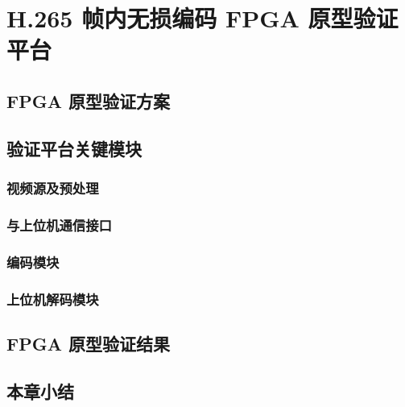 \chapter{H.265 帧内无损编码 FPGA 原型验证平台}
\label{cha:c5}

\section{FPGA 原型验证方案}

\section{验证平台关键模块}

\subsection{视频源及预处理}

\subsection{与上位机通信接口}

\subsection{编码模块}

\subsection{上位机解码模块}

\section{FPGA 原型验证结果}

\section{本章小结}